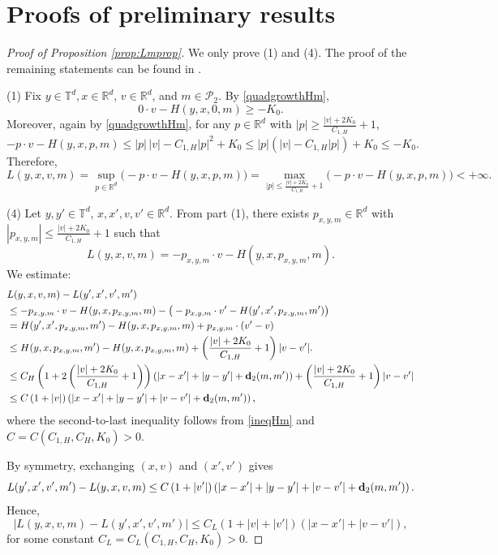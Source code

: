 \documentclass[reqno,11pt]{amsart}
\numberwithin{equation}{section}
\newcommand{\R}{\mathbb{R}} %
\begin{document}

\appendix


\section{Proofs of preliminary results}\label{proofofprelim}
\begin{proof}[Proof of Proposition \ref{prop:Lmprop}]
We only prove (1) and (4). The proof of the remaining statements can be found in \cite{tran_hamilton-jacobi_2021}.

\noindent
(1) Fix \(y \in \mathbb{T}^d, x\in \R^d\), \( v \in \mathbb{R}^d\), and \(m\in \mathcal{P}_2\). By \eqref{quadgrowthHm},
        \[
        0 \cdot v-H(y, x, 0, m)  \geq -K_0.
        \]
        Moreover, again by \eqref{quadgrowthHm}, for any $p \in \mathbb{R}^d$ with $\displaystyle|p|\geq \frac{|v|+2K_0}{C_{1,H}}+1$,
\[
-p \cdot v-H(y,x, p,m)
\leq  |p|\,|v|-C_{1,H}|p|^2+K_0\leq |p|\left(|v|-C_{1,H}|p|\right)+K_0 \leq -K_0.
\]
Therefore,
\[
L(y,x,v,m)=\sup_{p\in \mathbb{R}^d} \big( -p \cdot v-H(y,x,p,m)\big) = \max_{|p|\leq \frac{|v|+2K_0}{C_{1,H}}+1} \big(-p \cdot v-H(y,x, p, m)\big) <+\infty.
\]

\noindent
(4) Let $y,y' \in \mathbb{T}^d$, $x,x', v, v' \in \mathbb{R}^d$. From part (1), there exists \(p_{x,y,m} \in \R^d\) with \(|p_{x,y,m}| \leq \frac{|v|+2K_0}{C_{1,H}}+1 \) such that
\[
L(y,x,v,m) = -p_{x,y,m} \cdot v - H(y,x, p_{x,y,m},m).
\]
We estimate:
\[
\begin{aligned}
&L(y,x,v,m)-L(y',x',v',m')\\
&\leq -p_{x,y,m} \cdot v - H(y,x,p_{x,y,m},m) - \big(-p_{x,y,m} \cdot v' - H(y',x',p_{x,y,m},m')\big) \\
&= H(y',x', p_{x,y,m}, m') - H(y,x,p_{x,y,m},m) + p_{x,y,m} \cdot (v'-v) \\
&\leq H(y,x, p_{x,y,m},m') - H(y,x,p_{x,y,m},m) + \left(\frac{|v|+2K_0}{C_{1,H}}+1\right) |v-v'|.\\
& \leq C_H\left(1 + 2\left(\frac{|v|+2K_0}{C_{1,H}}+1\right) \right)\left(|x-x'|+|y-y'|+{\bf d}_2(m,m')\right)+ \left(\frac{|v|+2K_0}{C_{1,H}}+1\right) |v-v'|\\
& \leq C\left(1+|v|\right)\left(|x-x'|+|y-y'|+|v-v'|+{\bf d}_2(m,m')\right),
\end{aligned}
\]
where the second-to-last inequality follows from \eqref{ineqHm} and $C=C\left(C_{1, H}, C_H, K_0\right)>0$.

By symmetry, exchanging \((x,v)\) and \((x',v')\) gives
\[
L(y',x',v',m')-L(y,x,v,m) \leq C\left(1+|v'|\right)\left(|x-x'|+|y-y'|+|v-v'|+{\bf d}_2(m,m')\right).
\]
Hence,
\[
\left|L(y,x,v,m)-L(y',x',v',m')\right| \leq C_L\left(1+|v|+|v'|\right)\left(|x-x'|+|v-v'|\right),
\]
for some constant $C_L=C_L\left(C_{1, H}, C_H, K_0\right)>0$.
\end{proof}
\end{document}
